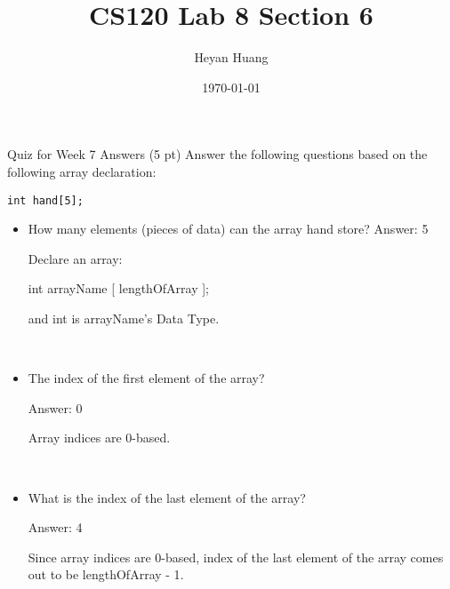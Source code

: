 \documentclass[presentation]{beamer}
\author{Heyan Huang}
\date{\today}
\title{CS120 Lab \alert{8} Section \alert{6}}
\begin{document}
\maketitle

\begin{frame}[fragile,label=sec-1]{Quiz for Week 7 \alert{Answers}}
 (5 pt) Answer the following questions based on the following array declaration:
\begin{verbatim}
int hand[5];
\end{verbatim}
\begin{itemize}
\item How many elements (pieces of data) can the array hand store?
Answer: \alert{5}

\alert{Declare} an array: 

int \alert{arrayName} [ \alert{lengthOfArray} ]; 

and \alert{int} is arrayName's \alert{Data Type}.
\end{itemize}
\\
\begin{itemize}
\item The index of the \alert{first element} of the array?

Answer: \alert{0}

Array indices are \alert{0-based}.
\end{itemize}
\\

\begin{itemize}
\item What is the index of the \alert{last element} of the array?

Answer: \alert{4}

Since array indices are \alert{0-based}, index of the \alert{last} element of the array comes out to be \alert{lengthOfArray - 1}.
\end{itemize}

\\
\end{frame}
\end{document}
